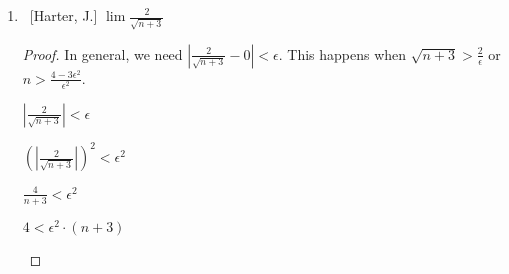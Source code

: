 \documentclass[10pt]{article}
\begin{document}
\begin{enumerate}
\begin{enumerate}
\begin{proof}
\begin{center}
     $|\frac{3n+1}{2n+5}-\frac{3}{2}|$

     $\leq |\frac{2 \cdot (3n+1)-3 \cdot (2n+1)}{2 \cdot (2n+1)}|$

     $=|\frac{6n+2-6n-3}{4n+2}|$

     $=|\frac{-1}{4n_2}|$

     $=\frac{1}{4n-2}$
     
     \end{center}
     This is less than $\epsilon < 0$ if $4n+2 > \epsilon^{-1}$ or $n > (\epsilon^{-1}-2)/4$.  Note that we can instead choose $n > \epsilon^{-1}/4$.
     
      Step 1: Let $\epsilon > 0$.
     
     Step 2: Let $N_1 = \frac{1}{4\epsilon}$.  If $n > N_1$, then $4n+2>\frac{1}{\epsilon}+2>\frac{1}{\epsilon}$.  Thus $\frac{1}{4n+2}<\epsilon$.  
     
     Step 3: Let $n \geq N$.
     
     Step 4: Consider
     \begin{center}

     $|a_n-a| = |\frac{3n+1}{2n+5}-\frac{3}{2}|$
        
             $|\frac{3n+1}{2n+5}-\frac{3}{2}|$

     $\leq |\frac{2 \cdot (3n+1)-3 \cdot (2n+1)}{2 \cdot (2n+1)}|$

     $=|\frac{6n+2-6n-3}{4n+2}|$

     $=|\frac{-1}{4n_2}|$

     $=\frac{1}{4n-2}$
     
     $< \epsilon$.
        
     \end{center}
     Therefore $\lim \frac{3n+1}{2n+5} \rightarrow 0$.
     
 \end{proof}
	\item  ~[Harter, J.] $\lim \frac{2}{\sqrt{n+3}}$
	 \begin{proof}
     In general, we need $|\frac{2}{\sqrt{n+3}}-0|<\epsilon$.
     This happens when $\sqrt{n+3}>\frac{2}{\epsilon}$ or $n>\frac{4-3\epsilon^2}{\epsilon^2}$.
     \begin{center}
     
     $|\frac{2}{\sqrt{n+3}}|<\epsilon$

     $(|\frac{2}{\sqrt{n+3}}|)^2 < \epsilon^2$

     $\frac{4}{n+3}<\epsilon^2$

     $4 < \epsilon^2 \cdot (n+3)$


\end{center}
\end{proof}
\end{enumerate}
\end{enumerate}
\end{document}
